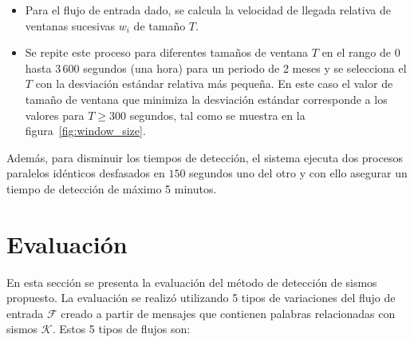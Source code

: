 	\begin{itemize}
	\item Para el flujo de entrada dado, se calcula la velocidad de llegada relativa de ventanas sucesivas $w_i$ de tamaño $T$.

	\item Se repite este proceso para diferentes tamaños de ventana $T$ en el rango de $0$ hasta $3\,600$ segundos (una hora) para un periodo de 2 meses y se selecciona el $T$ con la desviación estándar relativa más pequeña. En este caso el valor de tamaño de ventana que minimiza la desviación estándar corresponde a los valores para $T \geq 300$ segundos, tal como se muestra en la figura~\ref{fig:window_size}.

	\end{itemize}

	Además, para disminuir los tiempos de detección, el sistema ejecuta dos procesos paralelos idénticos desfasados en $150$ segundos uno del otro y con ello asegurar un tiempo de detección de máximo 5 minutos. 

		
\section{Evaluación}
\label{sec:evaluacion}

En esta sección se presenta la evaluación del método de detección de sismos propuesto. La evaluación se realizó utilizando 5 tipos de variaciones del flujo de entrada $\mathcal{F}$ creado a partir de mensajes que contienen palabras relacionadas con sismos $\mathcal{K}$. Estos 5 tipos de flujos son:

